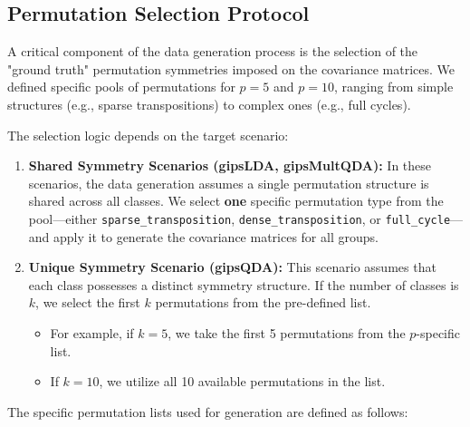 \documentclass[a4paper,11pt,twoside]{report}
\theoremstyle{definition}
\begin{document}
\subsection{Permutation Selection Protocol}

A critical component of the data generation process is the selection of the "ground truth" permutation symmetries imposed on the covariance matrices. We defined specific pools of permutations for $p=5$ and $p=10$, ranging from simple structures (e.g., sparse transpositions) to complex ones (e.g., full cycles).

The selection logic depends on the target scenario:

\begin{enumerate}
    \item \textbf{Shared Symmetry Scenarios (gipsLDA, gipsMultQDA):}
    In these scenarios, the data generation assumes a single permutation structure is shared across all classes. We select \textbf{one} specific permutation type from the pool—either \texttt{sparse\_transposition}, \texttt{dense\_transposition}, or \texttt{full\_cycle}—and apply it to generate the covariance matrices for all groups.

    \item \textbf{Unique Symmetry Scenario (gipsQDA):}
    This scenario assumes that each class possesses a distinct symmetry structure. If the number of classes is $k$, we select the first $k$ permutations from the pre-defined list.
    \begin{itemize}
        \item For example, if $k=5$, we take the first 5 permutations from the $p$-specific list.
        \item If $k=10$, we utilize all 10 available permutations in the list.
    \end{itemize}
\end{enumerate}

The specific permutation lists used for generation are defined as follows:
\end{document}
